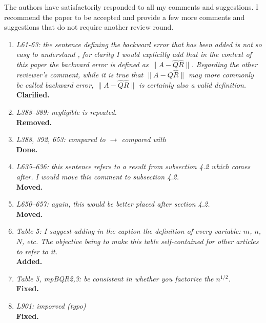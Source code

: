 \documentclass[final,onefignum,onetabnum]{siamart190516}
\begin{document}
The authors have satisfactorily responded to all my comments and suggestions. I recommend the paper to be accepted and provide a few more comments and suggestions that do not require another review round.
\begin{enumerate}
	\item {\it L61-63: the sentence defining the backward error that has been added is not so easy to understand , for clarity I would explicitly add that in the context of this paper the backward error is defined as $\|A- \hat{Q}\hat{R}\|$. Regarding the other reviewer’s comment, while it is true that $\|A-Q\hat{R}\|$  may more commonly be called backward error, $\|A-\hat{Q}\hat{R}\|$ is certainly also a valid definition. }\\
	{\bf Clarified.}
	\item {\it L388–389: negligible is repeated.}\\
	{\bf Removed.}
	\item {\it L388, 392, 653: compared to $\rightarrow$ compared with}\\
	{\bf Done.}
	\item {\it L635–636: this sentence refers to a result from subsection 4.2 which comes after. I would move this comment to subsection 4.2.}\\
	{\bf Moved.}
	\item {\it L650–657: again, this would be better placed after section 4.2.}\\
{\bf Moved.}
	\item {\it Table 5: I suggest adding in the caption the definition of every variable: $m$, $n$, $N$, etc. The objective being to make this table self-contained for other articles to refer to it.}\\
{\bf Added.}
	\item {\it Table 5, mpBQR2,3: be consistent in whether you factorize the $n^{1/2}$.}\\
	{\bf Fixed.}
	\item {\it L901: imporved (typo)}\\
	{\bf Fixed.}
\end{enumerate}

%

%
\end{document}
